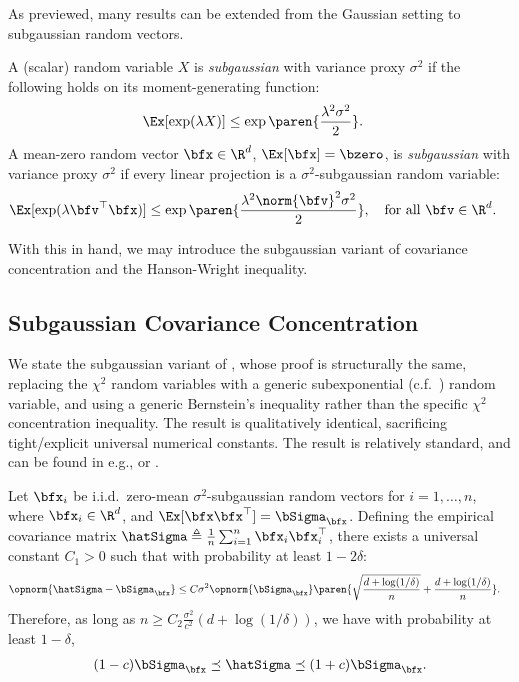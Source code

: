 As previewed, many results can be extended from the Gaussian setting to subgaussian random vectors.
\begin{definition}\label{def:subgaussian}
    A (scalar) random variable $X$ is \emph{subgaussian} with variance proxy $\sigma^2$ if the following holds on its moment-generating function:
    \begin{align*}
        \Ex[\exp(\lambda X)] &\leq \exp\paren{\frac{\lambda^2 \sigma^2}{2}}.
    \end{align*}
    A mean-zero random vector $\bfx \in \R^d$, $\Ex[\bfx] = \bzero$, is \emph{subgaussian} with variance proxy $\sigma^2$ if every linear projection is a $\sigma^2$-subgaussian random variable:
    \begin{align*}
        \Ex[\exp(\lambda \bfv^\top \bfx)] &\leq \exp\paren{\frac{\lambda^2 \norm{\bfv}^2 \sigma^2}{2}}, \quad \text{for all }\bfv \in \R^d.
    \end{align*}

\end{definition}
With this in hand, we may introduce the subgaussian variant of covariance concentration and the Hanson-Wright inequality.

\subsection{Subgaussian Covariance Concentration}

We state the subgaussian variant of , whose proof is structurally the same, replacing the $\chi^2$ random variables with a generic subexponential (c.f.\ \citet[Chapter 2]{vershynin2018high}) random variable, and using a generic Bernstein's inequality rather than the specific $\chi^2$ concentration inequality. The result is qualitatively identical, sacrificing tight/explicit universal numerical constants. The result is relatively standard, and can be found in e.g., \citet[Chapter 5]{vershynin2018high} or \citet[Lemma A.6]{du2020few}.
\begin{lemma}
    Let $\bfx_i$ be i.i.d.\ zero-mean $\sigma^2$-subgaussian random vectors for $i = 1,\dots,n$, where $\bfx_i \in \R^d$, and $\Ex[\bfx \bfx^\top ] = \bSigma_\bfx$. Defining the empirical covariance matrix $\hatSigma \triangleq \frac{1}{n}\sum_{i=1}^n \bfx_i \bfx_i^\top$, there exists a universal constant $C_1>0 $ such that with probability at least $1 - 2\delta$:
    \begin{align*}
        \opnorm{\hatSigma - \bSigma_\bfx} &\leq C \sigma^2 \opnorm{\bSigma_\bfx} \paren{\sqrt{\frac{d + \log(1/\delta)}{n}} + \frac{d + \log(1/\delta)}{n}}.
    \end{align*}
    Therefore, as long as $n \geq C_2 \frac{\sigma^2}{c^2} (d + \log(1/\delta))$, we have with probability at least $1 - \delta$,
    \begin{align*}
        (1-c) \bSigma_\bfx \preceq \hatSigma \preceq (1+c) \bSigma_\bfx.
    \end{align*}
\end{lemma}

